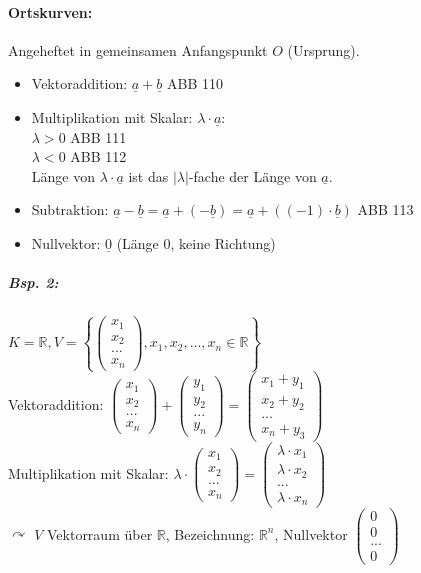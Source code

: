 \paragraph{Ortskurven:} Angeheftet in gemeinsamen Anfangspunkt $O$ (Ursprung).
\begin{itemize}
\item Vektoraddition: $\underline{a}+\underline{b}$ ABB 110
\item Multiplikation mit Skalar: $\lambda \cdot \underline{a}$:\\
$\lambda > 0$ ABB 111\\
$\lambda < 0$ ABB 112\\
Länge von $\lambda \cdot \underline{a}$ ist das $|\lambda|$-fache der Länge von $\underline{a}$.
\item Subtraktion: $\underline{a}-\underline{b}=\underline{a}+(-\underline{b})=\underline{a}+((-1)\cdot \underline{b})$ ABB 113
\item Nullvektor: $\underline{0}$ (Länge 0, keine Richtung)
\end{itemize}
\subparagraph{Bsp. 2:} \parskp
$K = \mathbb{R}, V = \left\lbrace \begin{pmatrix}
x_1\\ x_2 \\ ... \\ x_n
\end{pmatrix}, x_1, x_2, ..., x_n \in \mathbb{R}\right\rbrace$\\
Vektoraddition: $\begin{pmatrix}
x_1\\ x_2 \\ ... \\ x_n
\end{pmatrix} + \begin{pmatrix}
y_1\\ y_2 \\ ... \\ y_n
\end{pmatrix}=\begin{pmatrix}
x_1+y_1\\ x_2+y_2 \\ ... \\ x_n+y_3
\end{pmatrix}$\\
Multiplikation mit Skalar: $\lambda \cdot \begin{pmatrix}
x_1\\ x_2 \\ ... \\ x_n
\end{pmatrix} = \begin{pmatrix}
\lambda \cdot x_1\\ \lambda \cdot x_2 \\ ... \\  \lambda \cdot x_n
\end{pmatrix}$\medskip\\
$\curvearrowright$ $V$ Vektorraum über $\mathbb{R}$, Bezeichnung: $\mathbb{R}^n$, Nullvektor $\begin{pmatrix}
0\\ 0 \\ ... \\ 0
\end{pmatrix}$
